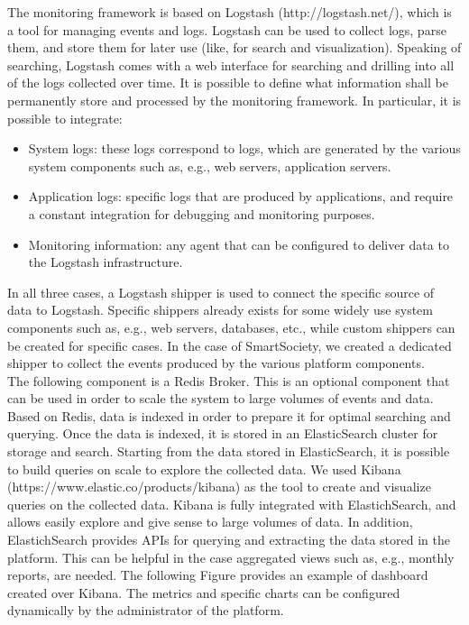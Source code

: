 The monitoring framework is based on Logstash (http://logstash.net/), which is a tool for managing events and logs. Logstash can be used to collect logs, parse them, and store them for later use (like, for search and visualization). Speaking of searching, Logstash comes with a web interface for searching and drilling into all of the logs collected over time.
It is possible to define what information shall be permanently store and processed by the monitoring framework. In particular, it is possible to integrate:
\begin{itemize}
\item System logs: these logs correspond to logs, which are generated by the various system components such as, e.g., web servers, application servers. 
\item Application logs: specific logs that are produced by applications, and require a constant integration for debugging and monitoring purposes.
\item Monitoring information: any agent that can be configured to deliver data to the Logstash infrastructure.
\end{itemize}

In all three cases, a Logstash shipper is used to connect the specific source of data to Logstash. Specific shippers already exists for some widely use system components such as, e.g., web servers, databases, etc., while custom shippers can be created for specific cases. In the case of SmartSociety, we created a dedicated shipper to collect the events produced by the various platform components.\\
The following component is a Redis Broker. This is an optional component that can be used in order to scale the system to large volumes of events and data. Based on Redis, data is indexed in order to prepare it for optimal searching and querying. Once the data is indexed, it is stored in an ElasticSearch cluster for storage and search. 
Starting from the data stored in ElasticSearch, it is possible to build queries on scale to explore the collected data. We used Kibana (https://www.elastic.co/products/kibana) as the tool to create and visualize queries on the collected data. Kibana is fully integrated with ElastichSearch, and allows easily explore and give sense to large volumes of data.
In addition, ElastichSearch provides APIs for querying and extracting the data stored in the platform. This can be helpful in the case aggregated views such as, e.g., monthly reports, are needed.
The following Figure provides an example of dashboard created over Kibana. The metrics and specific charts can be configured dynamically by the administrator of the platform.

